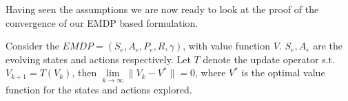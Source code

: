 Having seen the assumptions we are now ready to look at the proof of the convergence of our EMDP based formulation.

\begin{proposition}
    Consider the $EMDP = (S_e, A_e, P_e, R, \gamma)$, with value function $V$. $S_e, A_e$ are the evolving states and actions respectively. Let $T$ denote the update operator s.t. $V_{k+1}=T(V_{k})$, then $\underset{k \rightarrow \infty}{\lim} \lVert V_k - V^* \rVert = 0$, where $V^*$ is the optimal value function for the states and actions explored.
\end{proposition}
